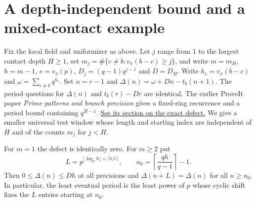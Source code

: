 \section{A depth-independent bound and a mixed-contact example}
\label{sec:mixed}
Fix the local field and uniformizer as above. Let $j$ range from $1$ to the
largest contact depth $H\ge1$, set $m_j=\#\{c\ne b:v_\pi(b-c)\ge j\}$, and write
$m=m_H$, $h=m-1$, $e=v_\pi(p)$, $D_j=(q-1)q^{j-1}$ and $D=D_H$.
Write $h_c=v_\pi(b-c)$ and $\omega=\sum_{c\ne b}q^{h_c}$. Set $n=r-1$ and $\Delta(n)=\omega+Dn-t_b(n+1)$. The period questions for
$\Delta(n)$ and $t_b(r)-Dr$ are identical.
The earlier ProveIt paper \emph{Prime patterns and branch precision}
gives a fixed-ring recurrence and a period bound containing $q^{H-1}$.
\href{https://github.com/VladimirReshetnikov/ProveIt/blob/b9a7c196e4aed3d93d4f222efef677a50efe912b/Analysis/GeneralizedRiemannHypothesis/Research/grh_prime_patterns_and_branch_precision/periodicity.tex}{See its section on the exact defect.}
We give a smaller universal test window whose length and starting index are independent of $H$ and of the counts $m_j$ for $j<H$.

\begin{theorem}
For $m=1$ the defect is identically zero. For $m\ge2$ put
\[
 L=p^{\lfloor\log_p h\rfloor+\lceil h/e\rceil},
 \qquad n_0=\left\lceil\frac{qh}{q-1}\right\rceil-1.
\]
Then $0\le\Delta(n)\le Dh$ at all precisions and
$\Delta(n+L)=\Delta(n)$ for all $n\ge n_0$.
In particular, the least eventual period is the least power of $p$ whose
cyclic shift fixes the $L$ entries starting at $n_0$.
\end{theorem}

